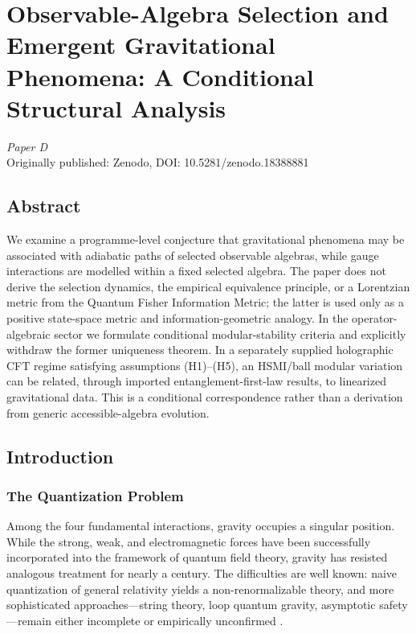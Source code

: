 \documentclass[12pt,a4paper,openany]{book}
\begin{document}
\chapter{Observable-Algebra Selection and Emergent Gravitational Phenomena: A Conditional Structural Analysis}
\label{H-chap:paperD}

\begin{center}
\textit{Paper D}\\[0.5em]
Originally published: Zenodo, DOI: 10.5281/zenodo.18388881
\end{center}

\bigskip

\section*{Abstract}
We examine a programme-level conjecture that gravitational phenomena may be associated with adiabatic paths of selected observable algebras, while gauge interactions are modelled within a fixed selected algebra.  The paper does not derive the selection dynamics, the empirical equivalence principle, or a Lorentzian metric from the Quantum Fisher Information Metric; the latter is used only as a positive state-space metric and information-geometric analogy.
In the operator-algebraic sector we formulate conditional modular-stability criteria and explicitly withdraw the former uniqueness theorem.  In a separately supplied holographic CFT regime satisfying assumptions (H1)--(H5), an HSMI/ball modular variation can be related, through imported entanglement-first-law results, to linearized gravitational data.  This is a conditional correspondence rather than a derivation from generic accessible-algebra evolution.


\section{Introduction}
\label{H-D-sec:intro}

\subsection{The Quantization Problem}

Among the four fundamental interactions, gravity occupies a singular position. While the strong, weak, and electromagnetic forces have been successfully incorporated into the framework of quantum field theory, gravity has resisted analogous treatment for nearly a century. The difficulties are well known: naive quantization of general relativity yields a non-renormalizable theory, and more sophisticated approaches—string theory, loop quantum gravity, asymptotic safety—remain either incomplete or empirically unconfirmed \cite{Kiefer2012}.
\end{document}
